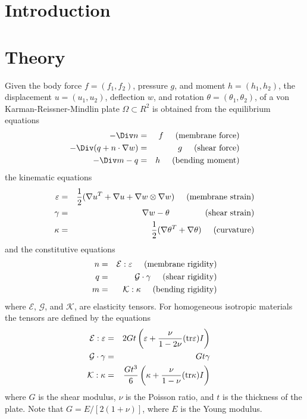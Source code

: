 
\begin{versiona}


\section{Introduction}

\section{Theory}

Given the body force $f=(f_1,f_2)$, pressure $g$, and moment
$h=(h_1,h_2)$, the displacement $u=(u_1,u_2)$, deflection $w$,
and rotation $\theta=(\theta_1,\theta_2)$, of a von Karman-Reissner-Mindlin
plate $\Omega \subset R^2$ is obtained from the equilibrium equations
\begin{eqnarray}
-\Div n & = & f \hskip5truemm (\mathrm{membrane \ force}) \\
-\Div(q + n\cdot \nabla w) & = & g \hskip5truemm (\mathrm{shear \ force}) \\
-\Div m - q & = & h \hskip5truemm (\mathrm{bending \ moment}) 
\end{eqnarray}
the kinematic equations
\begin{eqnarray}
\varepsilon & = & {1\over 2}(\nabla u^T + \nabla u + \nabla w \otimes \nabla w) 
\hskip5truemm (\mathrm{membrane \ strain}) \\
\gamma & = & \nabla w - \theta \hskip15truemm (\mathrm{shear \ strain}) \\
\kappa & = & {1\over 2}(\nabla \theta^T + \nabla \theta) 
\hskip5truemm (\mathrm{curvature}) 
\end{eqnarray}
and the constitutive equations
\begin{eqnarray}
n & = & \mathcal E : \varepsilon \hskip5truemm (\mathrm{membrane \ rigidity}) \\
q & = & \mathcal G \cdot \gamma \hskip5truemm (\mathrm{shear \ rigidity}) \\
m & = & \mathcal K : \kappa \hskip5truemm (\mathrm{bending \  rigidity}) 
\end{eqnarray}
where $\mathcal E$, $\mathcal G$, and $\mathcal K$, are elasticity tensors.
For homogeneous isotropic materials the tensors are defined by the equations
\begin{eqnarray}
\mathcal E : \varepsilon &=& 2Gt \left( \varepsilon 
+ {\nu\over 1-2\nu}(\mathrm{tr}\varepsilon) I \right) \hskip5truemm  \\
\mathcal G \cdot \gamma &=& Gt \gamma \hskip5truemm  \\
\mathcal K : \kappa &=& {Gt^3\over 6}\left( \kappa + {\nu\over 1-\nu}
(\mathrm{tr}\kappa) I\right) \hskip5truemm 
\end{eqnarray}
where $G$ is the shear modulus, $\nu$ is the Poisson ratio, and $t$
is the thickness of the plate. Note that $G=E/[2(1+\nu)]$, where $E$
is the Young modulus.


\end{versiona}
